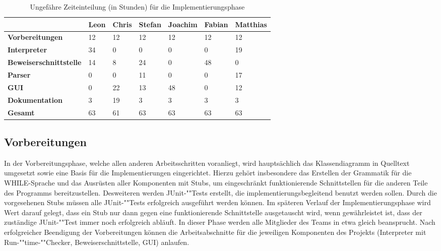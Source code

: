 \begin{figure}
	\label{gantt_impl}
\end{figure}

\begin{table}[H]
	\caption[B]{Ungefähre Zeiteinteilung (in Stunden) für die Implementierungsphase}
	\label{timeplan}
	\begin{tabular}{|l|l|l|l|l|l|l|}
		\hline
		 & \textbf{Leon} & \textbf{Chris} & \textbf{Stefan} & \textbf{Joachim} & \textbf{Fabian} & \textbf{Matthias} \\
		\hline
		\textbf{Vorbereitungen} & 12 & 12 & 12 & 12 & 12 & 12 \\
		\hline
		\textbf{Interpreter} & 34 & 0 & 0 & 0 & 0 & 19 \\
		\hline
		\textbf{Beweiserschnittstelle} & 14 & 8 & 24 & 0 & 48 & 0 \\
		\hline
		\textbf{Parser} & 0 & 0 & 11 & 0 & 0 & 17 \\
		\hline
		\textbf{GUI} & 0 & 22 & 13 & 48 & 0 & 12 \\
		\hline
		\textbf{Dokumentation} & 3 & 19 & 3 & 3 & 3 & 3 \\
		\hline
		\textbf{Gesamt}	& 63 & 61 & 63 & 63 & 63 & 63 \\
		\hline
	\end{tabular}
\end{table}

\subsection{Vorbereitungen}
In der Vorbereitungsphase, welche allen anderen Arbeitsschritten voranliegt, wird hauptsächlich das Klassendiagramm in Quelltext umgesetzt sowie eine Basis für die Implementierungen eingerichtet. Hierzu gehört insbesondere das Erstellen der Grammatik für die WHILE-Sprache und das Ausrüsten aller Komponenten mit Stubs, um eingeschränkt funktionierende Schnittstellen für die anderen Teile des Programms bereitzustellen. Desweiteren werden JUnit-""Tests erstellt, die implementierungsbegleitend benutzt werden sollen. Durch die vorgesehenen Stubs müssen alle JUnit-""Tests erfolgreich ausgeführt werden können. Im späteren Verlauf der Implementierungsphase wird Wert darauf gelegt, dass ein Stub nur dann gegen eine funktionierende Schnittstelle ausgetauscht wird, wenn gewährleistet ist, dass der zuständige JUnit-""Test immer noch erfolgreich abläuft. In dieser Phase werden alle Mitglieder des Teams in etwa gleich beansprucht. Nach erfolgreicher Beendigung der Vorbereitungen können die Arbeitsabschnitte für die jeweiligen Komponenten des Projekts (Interpreter mit Run-""time-""Checker, Beweiserschnittstelle, GUI) anlaufen.

